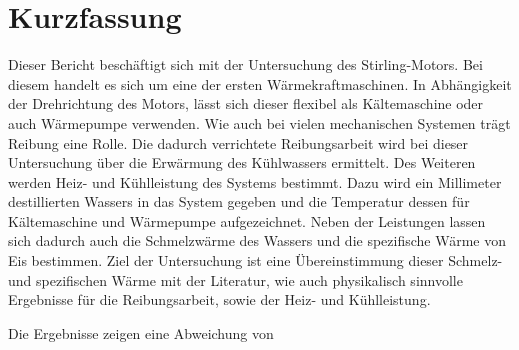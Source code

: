 \section{Kurzfassung}

Dieser Bericht beschäftigt sich mit der Untersuchung des Stirling-Motors.
Bei diesem handelt es sich um eine der ersten Wärmekraftmaschinen.
In Abhängigkeit der Drehrichtung des Motors, lässt sich dieser flexibel als Kältemaschine oder auch Wärmepumpe verwenden.
Wie auch bei vielen mechanischen Systemen trägt Reibung eine Rolle.
Die dadurch verrichtete Reibungsarbeit wird bei dieser Untersuchung über die Erwärmung des Kühlwassers ermittelt.
Des Weiteren werden Heiz- und Kühlleistung des Systems bestimmt.
Dazu wird ein Millimeter destillierten Wassers in das System gegeben und die Temperatur dessen für Kältemaschine und Wärmepumpe aufgezeichnet.
Neben der Leistungen lassen sich dadurch auch die Schmelzwärme des Wassers und die spezifische Wärme von Eis bestimmen.
Ziel der Untersuchung ist eine Übereinstimmung dieser Schmelz- und spezifischen Wärme mit der Literatur, wie auch physikalisch sinnvolle Ergebnisse für die Reibungsarbeit, sowie der Heiz- und Kühlleistung.

Die Ergebnisse zeigen eine Abweichung von %
